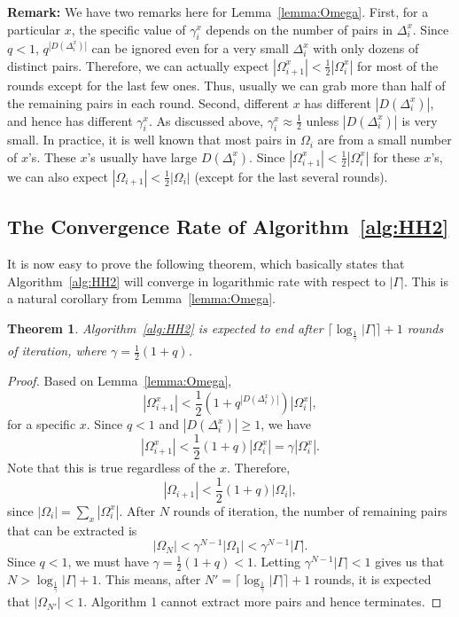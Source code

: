 \documentclass[10pt,journal,cspaper,compsoc]{IEEEtran}
\newcommand{\blankline}{\vspace*{2ex}}
\newcommand{\remark}[1]{\blankline\noindent\textbf{Remark: }#1}
\newtheorem{theorem}{Theorem}
\begin{document}
\remark{We have two remarks here for Lemma~\ref{lemma:Omega}.
First, for a particular $x$, the specific value of $\gamma_i^x$ depends on the number of pairs in $\Delta_i^x$.
Since $q<1$, $q^{|D(\Delta_i^x)|}$ can be ignored even for a very small $\Delta_i^x$ with only dozens of distinct pairs.
Therefore, we can actually expect $|\Omega_{i+1}^x|<\frac{1}{2}|\Omega_i^x|$ for most of the rounds except for the last few ones.
Thus, usually we can grab more than half of the remaining pairs in each round.
Second, different $x$ has different $|D(\Delta_i^x)|$, and hence has different $\gamma_i^x$.
As discussed above, $\gamma_i^x\approx\frac{1}{2}$ unless $|D(\Delta_{i}^x)|$ is very small.
In practice, it is well known that most pairs in $\Omega_i$ are from a small number of $x$'s. These $x$'s usually have large $D(\Delta_{i}^x)$.
Since $|\Omega_{i+1}^x|<\frac{1}{2}|\Omega_i^x|$ for these $x$'s, we can also expect $|\Omega_{i+1}|<\frac{1}{2}|\Omega_i|$ (except for the last several rounds).
}

\subsection{The Convergence Rate of Algorithm~\ref{alg:HH2}}

It is now easy to prove the following theorem, which basically states that Algorithm~\ref{alg:HH2} will converge in logarithmic rate with respect to $|\Gamma|$.
This is a natural corollary from Lemma~\ref{lemma:Omega}.

\begin{theorem}\label{theorem:convergence}
Algorithm~\ref{alg:HH2} is expected to end after $\lceil\log_{\frac{1}{\gamma}}|\Gamma|\rceil+1$ rounds of iteration, where $\gamma=\frac{1}{2}(1+q)$.
\end{theorem}

\begin{proof}
Based on Lemma~\ref{lemma:Omega},
\begin{equation}
|\Omega_{i+1}^x|<\frac{1}{2}(1+q^{|D(\Delta_i^x)|})|\Omega_i^x|,
\end{equation}
for a specific $x$. Since $q<1$ and $|D(\Delta_i^x)|\geq 1$, we have
\begin{equation}
|\Omega_{i+1}^x|<\frac{1}{2}(1+q)|\Omega_i^x|=\gamma|\Omega_i^x|.
\end{equation}
Note that this is true regardless of the $x$. Therefore,
\begin{equation}
|\Omega_{i+1}|<\frac{1}{2}(1+q)|\Omega_i|,
\end{equation}
since $|\Omega_i|=\sum_{x}|\Omega_i^x|$. After $N$ rounds of iteration, the number of remaining pairs that can be extracted is 
\begin{equation}
|\Omega_N|< \gamma^{N-1}|\Omega_1| < \gamma^{N-1}|\Gamma|.
\end{equation}
Since $q<1$, we must have $\gamma=\frac{1}{2}(1+q)<1$. Letting $\gamma^{N-1}|\Gamma| < 1$ gives us that $N > \log_{\frac{1}{\gamma}}|\Gamma|+1$. This means, after $N'=\lceil\log_{\frac{1}{\gamma}}|\Gamma|\rceil+1$ rounds, it is expected that $|\Omega_{N'}|<1$. 
Algorithm 1 cannot extract more pairs and hence terminates.
\end{proof}
\end{document}

